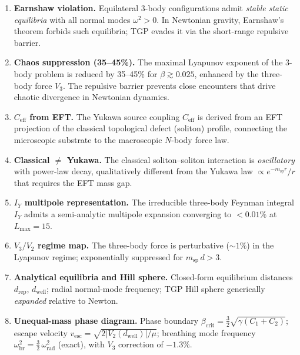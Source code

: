 \begin{enumerate}[nosep]
  \item \textbf{Earnshaw violation.}
        Equilateral 3-body configurations admit \emph{stable static
        equilibria} with all normal modes $\omega^{2}>0$.
        In Newtonian gravity, Earnshaw's theorem forbids such
        equilibria; TGP evades it via the short-range repulsive
        barrier.

  \item \textbf{Chaos suppression (35--45\%).}
        The maximal Lyapunov exponent of the 3-body problem is
        reduced by 35--45\% for $\beta\gtrsim 0.025$, enhanced
        by the three-body force $V_{3}$.  The repulsive barrier
        prevents close encounters that drive chaotic divergence
        in Newtonian dynamics.

  \item \textbf{$C_{\mathrm{eff}}$ from EFT.}
        The Yukawa source coupling $C_{\mathrm{eff}}$ is derived
        from an EFT projection of the classical topological defect
        (soliton) profile, connecting the microscopic substrate
        to the macroscopic $N$-body force law.

  \item \textbf{Classical $\neq$ Yukawa.}
        The classical soliton--soliton interaction is
        \emph{oscillatory} with power-law decay, qualitatively
        different from the Yukawa law $\propto e^{-m_{\mathrm{sp}}r}/r$
        that requires the EFT mass gap.

  \item \textbf{$I_{Y}$ multipole representation.}
        The irreducible three-body Feynman integral $I_{Y}$ admits
        a semi-analytic multipole expansion converging to
        $<0.01\%$ at $L_{\max}=15$.

  \item \textbf{$V_{3}/V_{2}$ regime map.}
        The three-body force is perturbative ($\sim 1\%$) in the
        Lyapunov regime; exponentially suppressed for
        $m_{\mathrm{sp}}\,d > 3$.

  \item \textbf{Analytical equilibria and Hill sphere.}
        Closed-form equilibrium distances $d_{\mathrm{rep}}$,
        $d_{\mathrm{well}}$; radial normal-mode frequency;
        TGP Hill sphere generically \emph{expanded} relative to
        Newton.

  \item \textbf{Unequal-mass phase diagram.}
        Phase boundary
        $\beta_{\mathrm{crit}}=\frac{3}{2}\sqrt{\gamma(C_{1}+C_{2})}$;
        escape velocity
        $v_{\mathrm{esc}}=\sqrt{2|V_{2}(d_{\mathrm{well}})|/\mu}$;
        breathing mode frequency
        $\omega_{\mathrm{br}}^{2}=\frac{3}{2}\,\omega_{\mathrm{rad}}^{2}$
        (exact), with $V_{3}$ correction of $-1.3\%$.


\end{enumerate}

